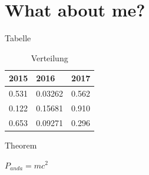 \documentclass{beamer}
\begin{document}
    \section{What about me?}
        \begin{frame}{Tabelle}
            \begin{table}
                \begin{tabular}{l l l}
                    \toprule
                    \textbf{2015} & \textbf{2016} & \textbf{2017}\\
                    \midrule
                    0.531 & 0.03262 & 0.562 \\
                    0.122 & 0.15681 & 0.910 \\
                    0.653 & 0.09271 & 0.296 \\
                    \bottomrule
                \end{tabular}
                \caption{Verteilung}
            \end{table}
        \end{frame}

        \begin{frame}{Theorem}
            \begin{theorem}[Formel xy]
                $P_{anda}=mc^2$
            \end{theorem}
        \end{frame}
\end{document}

